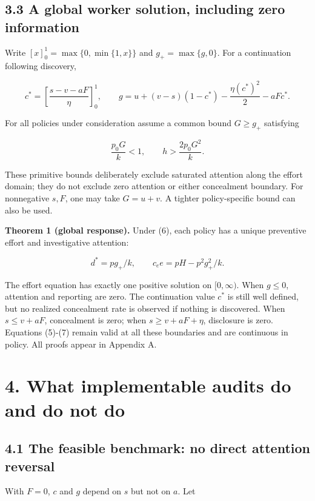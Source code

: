 \documentclass[
  11pt,
]{article}
\begin{document}
\subsection{3.3 A global worker solution, including zero
information}\label{a-global-worker-solution-including-zero-information}

Write \([x]_0^1=\max\{0,\min\{1,x\}\}\) and \(g_+=\max\{g,0\}\). For a
continuation following discovery,

\[c^*=\left[\frac{s-v-aF}{\eta}\right]_0^1,\qquad
 g=u+(v-s)(1-c^*)-\frac{\eta(c^*)^2}{2}-aFc^*. \tag{5}\]

For all policies under consideration assume a common bound \(G\geq g_+\)
satisfying

\[\frac{p_0G}{k}<1,\qquad h>\frac{2p_0G^2}{k}. \tag{6}\]

These primitive bounds deliberately exclude saturated attention along
the effort domain; they do not exclude zero attention or either
concealment boundary. For nonnegative \(s,F\), one may take \(G=u+v\). A
tighter policy-specific bound can also be used.

\textbf{Theorem 1 (global response).} Under (6), each policy has a
unique preventive effort and investigative attention:

\[d^*=pg_+/k,\qquad
 c_e e=pH-p^2g_+^2/k. \tag{7}\]

The effort equation has exactly one positive solution on \([0,\infty)\).
When \(g\leq0\), attention and reporting are zero. The continuation
value \(c^*\) is still well defined, but no realized concealment rate is
observed if nothing is discovered. When \(s\leq v+aF\), concealment is
zero; when \(s\geq v+aF+\eta\), disclosure is zero. Equations (5)-(7)
remain valid at all these boundaries and are continuous in policy. All
proofs appear in Appendix A.

\section{4. What implementable audits do and do not
do}\label{what-implementable-audits-do-and-do-not-do}

\subsection{4.1 The feasible benchmark: no direct attention
reversal}\label{the-feasible-benchmark-no-direct-attention-reversal}

With \(F=0\), \(c\) and \(g\) depend on \(s\) but not on \(a\). Let
\end{document}
